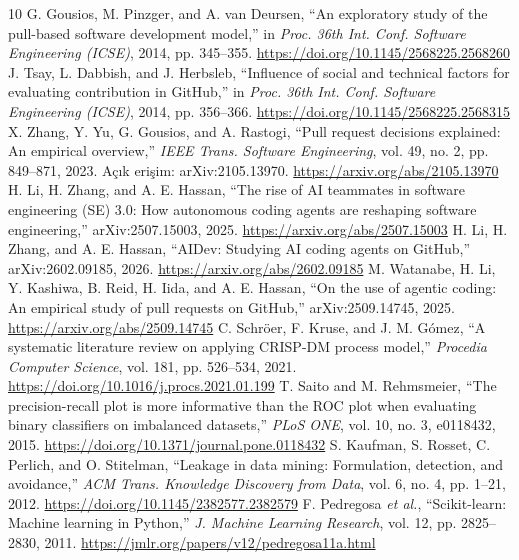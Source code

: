 \documentclass[conference]{IEEEtran}
\begin{document}
\balance
\begin{thebibliography}{10}
 G. Gousios, M. Pinzger, and A. van Deursen, ``An exploratory study of the pull-based software development model,'' in \textit{Proc. 36th Int. Conf. Software Engineering (ICSE)}, 2014, pp. 345--355. \url{https://doi.org/10.1145/2568225.2568260}
 J. Tsay, L. Dabbish, and J. Herbsleb, ``Influence of social and technical factors for evaluating contribution in GitHub,'' in \textit{Proc. 36th Int. Conf. Software Engineering (ICSE)}, 2014, pp. 356--366. \url{https://doi.org/10.1145/2568225.2568315}
 X. Zhang, Y. Yu, G. Gousios, and A. Rastogi, ``Pull request decisions explained: An empirical overview,'' \textit{IEEE Trans. Software Engineering}, vol. 49, no. 2, pp. 849--871, 2023. Açık erişim: arXiv:2105.13970. \url{https://arxiv.org/abs/2105.13970}
 H. Li, H. Zhang, and A. E. Hassan, ``The rise of AI teammates in software engineering (SE) 3.0: How autonomous coding agents are reshaping software engineering,'' arXiv:2507.15003, 2025. \url{https://arxiv.org/abs/2507.15003}
 H. Li, H. Zhang, and A. E. Hassan, ``AIDev: Studying AI coding agents on GitHub,'' arXiv:2602.09185, 2026. \url{https://arxiv.org/abs/2602.09185}
 M. Watanabe, H. Li, Y. Kashiwa, B. Reid, H. Iida, and A. E. Hassan, ``On the use of agentic coding: An empirical study of pull requests on GitHub,'' arXiv:2509.14745, 2025. \url{https://arxiv.org/abs/2509.14745}
 C. Schröer, F. Kruse, and J. M. Gómez, ``A systematic literature review on applying CRISP-DM process model,'' \textit{Procedia Computer Science}, vol. 181, pp. 526--534, 2021. \url{https://doi.org/10.1016/j.procs.2021.01.199}
 T. Saito and M. Rehmsmeier, ``The precision-recall plot is more informative than the ROC plot when evaluating binary classifiers on imbalanced datasets,'' \textit{PLoS ONE}, vol. 10, no. 3, e0118432, 2015. \url{https://doi.org/10.1371/journal.pone.0118432}
 S. Kaufman, S. Rosset, C. Perlich, and O. Stitelman, ``Leakage in data mining: Formulation, detection, and avoidance,'' \textit{ACM Trans. Knowledge Discovery from Data}, vol. 6, no. 4, pp. 1--21, 2012. \url{https://doi.org/10.1145/2382577.2382579}
 F. Pedregosa \textit{et al.}, ``Scikit-learn: Machine learning in Python,'' \textit{J. Machine Learning Research}, vol. 12, pp. 2825--2830, 2011. \url{https://jmlr.org/papers/v12/pedregosa11a.html}
\end{thebibliography}
\end{document}
